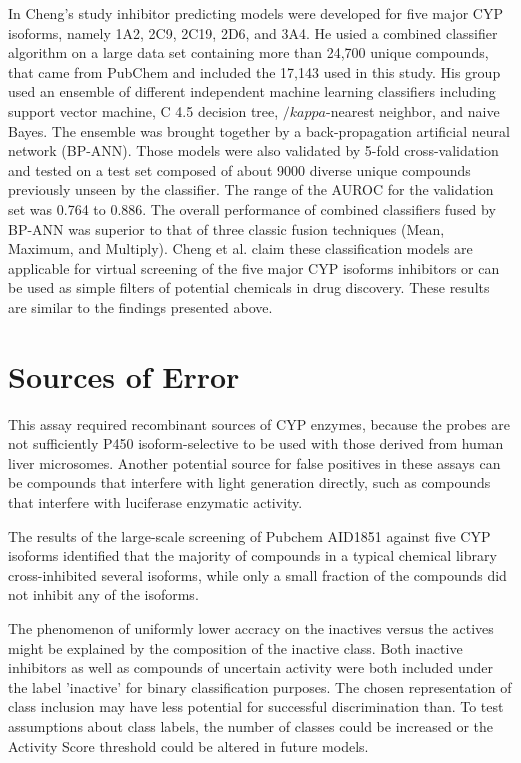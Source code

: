 In Cheng's study inhibitor predicting models were developed for five major CYP isoforms, namely 1A2, 2C9, 2C19, 2D6, and 3A4. He usied a combined classifier algorithm on a large data set containing more than 24,700 unique compounds, that came from PubChem and included the 17,143 used in this study. His group used an ensemble of different independent machine learning classifiers including support vector machine, C 4.5 decision tree, $/kappa$-nearest neighbor, and naive Bayes. The ensemble was brought together by a back-propagation artificial neural network (BP-ANN). Those models were also validated by 5-fold cross-validation  and tested on a test set composed of about 9000 diverse unique compounds previously unseen by the classifier. The range of the AUROC for the validation set was 0.764 to 0.886. The overall performance of combined classifiers fused by BP-ANN was superior to that of three classic fusion techniques (Mean, Maximum, and Multiply). Cheng et al. claim these classification models are applicable for virtual screening of the five major CYP isoforms inhibitors or can be used as simple filters of potential chemicals in drug discovery. \cite{Cheng2011} These results are similar to the findings presented above.


\section{Sources of Error}
This assay required recombinant sources of CYP enzymes, because the probes are not sufficiently P450 isoform-selective to be used with those derived from human liver microsomes. Another potential source for false positives in these assays can be compounds that interfere with light generation directly, such as compounds that interfere with luciferase enzymatic activity. \cite{Zlokarnik2005}

The results of the large-scale screening of Pubchem AID1851 against five CYP isoforms identified that the majority of compounds in a typical chemical library cross-inhibited several isoforms, while only a small fraction of the compounds did not inhibit any of the isoforms. \cite{Veith2009}

The phenomenon of uniformly lower accracy on the inactives versus the actives might be explained by the composition of the inactive class. Both inactive inhibitors as well as compounds of uncertain activity were both included under the label 'inactive' for binary classification purposes. The chosen representation of class inclusion may have less potential for successful discrimination than. To test assumptions about class labels, the number of classes could be increased or the Activity Score threshold could be altered in future models.


